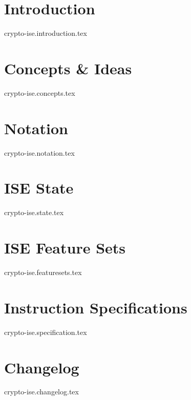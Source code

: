 \documentclass{article}
\begin{document}

\section{Introduction}
{crypto-ise.introduction.tex}

\section{Concepts \& Ideas}
{crypto-ise.concepts.tex}

\section{Notation}
{crypto-ise.notation.tex}

\section{ISE State}
{crypto-ise.state.tex}

\section{ISE Feature Sets}
{crypto-ise.featuresets.tex}

\section{Instruction Specifications}
{crypto-ise.specification.tex}


\printbibliography


\newpage
\section{Changelog}
{crypto-ise.changelog.tex}
\end{document}
